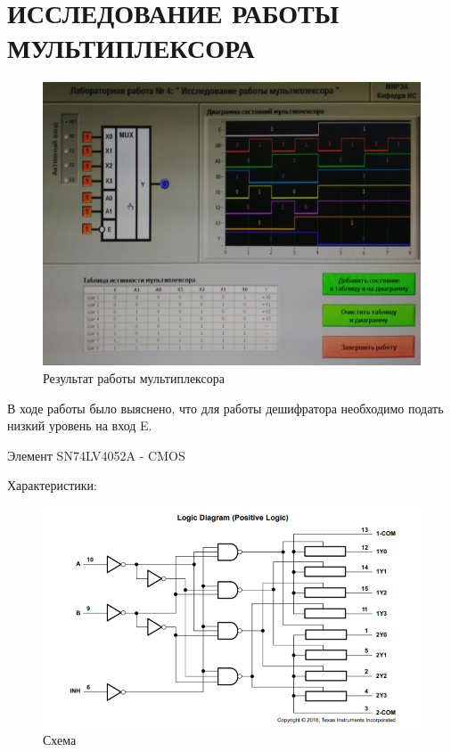 \section{ИССЛЕДОВАНИЕ РАБОТЫ МУЛЬТИПЛЕКСОРА}

\begin{figure}[H]
	\centering
	\includegraphics[width=0.95\linewidth]{imgs/4/1}
	\caption{Результат работы мультиплексора}
	\label{fig:4_}
\end{figure}

В ходе работы было выяснено, что для работы дешифратора необходимо подать низкий уровень на вход E.

Элемент SN74LV4052A - CMOS

Характеристики:

\begin{figure}[H]
	\centering
	\includegraphics[width=0.95\linewidth]{imgs/4/ti1}
	\caption{Схема}
	\label{fig:4_ti1}
\end{figure}

